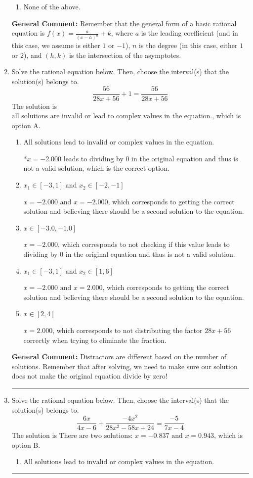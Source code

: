 \documentclass{extbook}[14pt]
\newcommand{\litem}[1]{\item #1

\rule{\textwidth}{0.4pt}}
\begin{document}
\begin{enumerate}
{\begin{enumerate}[label=\Alph*.]
\begin{multicols}{2}
\end{multicols}\item None of the above.\end{enumerate}
\textbf{General Comment:} Remember that the general form of a basic rational equation is $ f(x) = \frac{a}{(x-h)^n} + k$, where $a$ is the leading coefficient (and in this case, we assume is either $1$ or $-1$), $n$ is the degree (in this case, either $1$ or $2$), and $(h, k)$ is the intersection of the asymptotes.
}
\litem{
Solve the rational equation below. Then, choose the interval(s) that the solution(s) belongs to.
\[ \frac{56}{28x + 56} + 1 = \frac{56}{28x + 56} \]The solution is \( \text{all solutions are invalid or lead to complex values in the equation.} \), which is option A.\begin{enumerate}[label=\Alph*.]
\item \( \text{All solutions lead to invalid or complex values in the equation.} \)

*$x = -2.000$ leads to dividing by 0 in the original equation and thus is not a valid solution, which is the correct option.
\item \( x_1 \in [-3, 1] \text{ and } x_2 \in [-2,-1] \)

$x = -2.000 \text{ and } x = -2.000$, which corresponds to getting the correct solution and believing there should be a second solution to the equation.
\item \( x \in [-3.0,-1.0] \)

$x = -2.000$, which corresponds to not checking if this value leads to dividing by 0 in the original equation and thus is not a valid solution.
\item \( x_1 \in [-3, 1] \text{ and } x_2 \in [1,6] \)

$x = -2.000 \text{ and } x = 2.000$, which corresponds to getting the correct solution and believing there should be a second solution to the equation.
\item \( x \in [2,4] \)

$x = 2.000$, which corresponds to not distributing the factor $28x + 56$ correctly when trying to eliminate the fraction.
\end{enumerate}

\textbf{General Comment:} Distractors are different based on the number of solutions. Remember that after solving, we need to make sure our solution does not make the original equation divide by zero!
}
\litem{
Solve the rational equation below. Then, choose the interval(s) that the solution(s) belongs to.
\[ \frac{6x}{4x -6} + \frac{-4x^{2}}{28x^{2} -58 x + 24} = \frac{-5}{7x -4} \]The solution is \( \text{There are two solutions: } x = -0.837 \text{ and } x = 0.943 \), which is option B.\begin{enumerate}[label=\Alph*.]
\item \( \text{All solutions lead to invalid or complex values in the equation.} \)



\end{enumerate}}
\end{enumerate}
\end{document}
